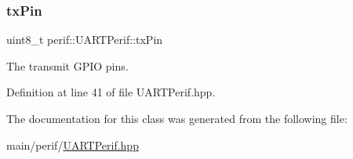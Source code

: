 \mbox{\label{classperif_1_1UARTPerif_a338fb2e5db8bd91213b13524ac9d89aa}} 
\subsubsection{\texorpdfstring{txPin}{txPin}}
{\footnotesize\ttfamily uint8\+\_\+t perif\+::\+U\+A\+R\+T\+Perif\+::tx\+Pin\hspace{0.3cm}{\ttfamily [protected]}}

The transmit G\+P\+IO pins. 

Definition at line 41 of file U\+A\+R\+T\+Perif.\+hpp.



The documentation for this class was generated from the following file\+:\begin{DoxyCompactItemize}
\item 
main/perif/\mbox{\hyperlink{UARTPerif_8hpp}{U\+A\+R\+T\+Perif.\+hpp}}\end{DoxyCompactItemize}

